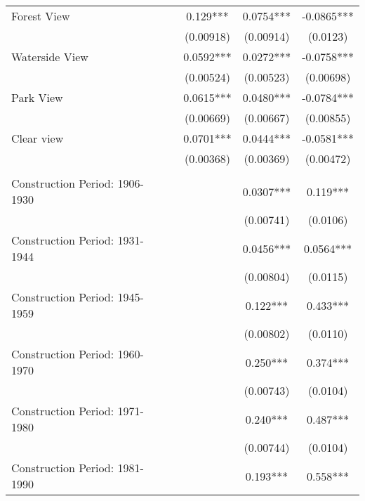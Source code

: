 \documentclass[12pt]{article}
\begin{document}
\begin{table}[H]
\begin{tabular}{lcccc}
Forest View                           &            & 0.129***    & 0.0754***   & -0.0865***   \\
                                &            & (0.00918)   & (0.00914)   & (0.0123)     \\
Waterside View                      &            & 0.0592***   & 0.0272***   & -0.0758***   \\
                                &            & (0.00524)   & (0.00523)   & (0.00698)    \\
Park View                           &            & 0.0615***   & 0.0480***   & -0.0784***   \\
                                &            & (0.00669)   & (0.00667)   & (0.00855)    \\
Clear view                      &            & 0.0701***   & 0.0444***   & -0.0581***   \\
                                &            & (0.00368)   & (0.00369)   & (0.00472)    \\
      &            &             &             &              \\
Construction Period: 1906-1930                       &            &             & 0.0307***   & 0.119***     \\
                                &            &             & (0.00741)   & (0.0106)     \\
Construction Period: 1931-1944                       &            &             & 0.0456***   & 0.0564***    \\
                                &            &             & (0.00804)   & (0.0115)     \\
Construction Period: 1945-1959                       &            &             & 0.122***    & 0.433***     \\
                                &            &             & (0.00802)   & (0.0110)     \\
Construction Period: 1960-1970                       &            &             & 0.250***    & 0.374***     \\
                                &            &             & (0.00743)   & (0.0104)     \\
Construction Period: 1971-1980                       &            &             & 0.240***    & 0.487***     \\
                                &            &             & (0.00744)   & (0.0104)     \\
Construction Period: 1981-1990                       &            &             & 0.193***    & 0.558***     \\

\end{tabular}
\end{table}
\end{document}
